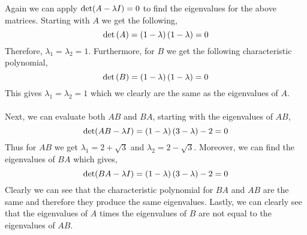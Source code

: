 \begin{enumerate}[label=\arabic*.]
\begin{mdframed}[style=MyFrame]
            Again we can apply $\text{det}(A-\lambda I) = 0$ to find the
            eigenvalues for the above matrices. Starting with $A$ we
            get the following,
            \begin{equation}
                \text{det} \left(A\right) =
                \left(1-\lambda\right)\left(1-\lambda\right) = 0
            \end{equation}
            Therefore, $\lambda_{1} = \lambda_{2} =1$. Furthermore, for
            $B$ we get the following characteristic polynomial, 
            \begin{equation}
                \text{det} \left(B\right) = 
                \left(1-\lambda\right)\left(1-\lambda\right) = 0
            \end{equation}
            This gives $\lambda_{1} = \lambda_{2} = 1$ which we clearly
            are the same as the eigenvalues of $A$. 
            \\
            \\
            Next, we can evaluate both $AB$ and $BA$, starting with the
            eigenvalues of $AB$,
            \begin{equation}
                \text{det}(AB-\lambda I ) = 
                \left(1-\lambda\right)\left(3-\lambda\right)-2= 0
            \end{equation}
            Thus for $AB$ we get $\lambda_{1} = 2+\sqrt{3}$ and
            $\lambda_{2} =  2-\sqrt{3}$. Moreover, we can find the
            eigenvalues of $BA$ which gives,
            \begin{equation}
                \text{det}(BA-\lambda I ) = 
                \left(1-\lambda\right) \left(3-\lambda\right)-2= 0
            \end{equation}
            Clearly we can see that the characteristic polynomial for
            $BA$ and $AB$ are the same and  therefore they produce the
            same eigenvalues. Lastly, we can clearly see that the
            eigenvalues of $A$ times the eigenvalues of $B$ are not
            equal to the eigenvalues of $AB$. 
        \end{mdframed}


\end{enumerate}
